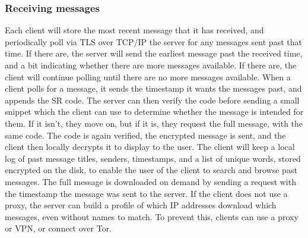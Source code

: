 \documentclass{article}
\begin{document}
\subsubsection{Receiving messages}
Each client will store the most recent message that it has received, and periodically poll via TLS over TCP/IP the server for any messages sent past that time. If there are, the server will send the earliest message past the received time, and a bit indicating whether there are more messages available. If there are, the client will continue polling until there are no more messages available. When a client polls for a message, it sends the timestamp it wants the messages past, and appends the SR code. The server can then verify the code before sending a small snippet which the client can use to determine whether the message is intended for them. If it isn't, they move on, but if it is, they request the full message, with the same code. The code is again verified, the encrypted message is sent, and the client then locally decrypts it to display to the user. The client will keep a local log of past message titles, senders, timestamps, and a list of unique words, stored encrypted on the disk, to enable the user of the client to search and browse past messages. The full message is downloaded on demand by sending a request with the timestamp the message was sent to the server. If the client does not use a proxy, the server can build a profile of which IP addresses download which messages, even without names to match. To prevent this, clients can use a proxy or VPN, or connect over Tor.
\end{document}
